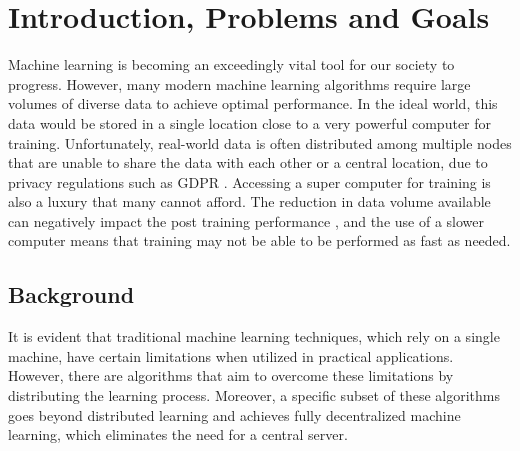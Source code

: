 \chapter{Introduction, Problems and Goals}
Machine learning is becoming an exceedingly vital tool for our society to progress. However, many modern machine learning algorithms require large volumes of diverse data to achieve optimal performance. In the ideal world, this data would be stored in a single location close to a very powerful computer for training. Unfortunately, real-world data is often distributed among multiple nodes that are unable to share the data with each other or a central location, due to privacy regulations such as GDPR \cite{gdpr}. Accessing a super computer for training is also a luxury that many cannot afford. The reduction in data volume available can negatively impact the post training performance \cite{data_volume}, and the use of a slower computer means that training may not be able to be performed as fast as needed.

\section{Background}
It is evident that traditional machine learning techniques, which rely on a single machine, have certain limitations when utilized in practical applications. However, there are algorithms that aim to overcome these limitations by distributing the learning process. Moreover, a specific subset of these algorithms goes beyond distributed learning and achieves fully decentralized machine learning, which eliminates the need for a central server.

